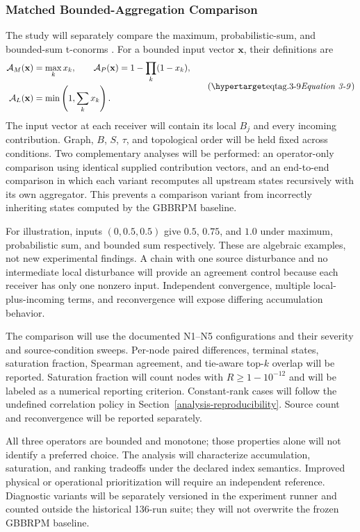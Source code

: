 \subsubsection{Matched Bounded-Aggregation Comparison}
\label{aggregation-comparison}

The study will separately compare the maximum, probabilistic-sum, and
bounded-sum t-conorms \citep{klement2004}. For a bounded input vector
$\mathbf{x}$, their definitions are
\[
\begin{aligned}
\mathcal{A}_{M}(\mathbf{x})&=\max_k x_k,\qquad
\mathcal{A}_{P}(\mathbf{x})=1-\prod_k(1-x_k),\\
\mathcal{A}_{L}(\mathbf{x})&=\min\left(1,\sum_k x_k\right).
\end{aligned}
\eqtag{3-9}
\]
The input vector at each receiver will contain its local $B_j$ and
every incoming contribution. Graph, $B$, $S$, $\tau$, and topological
order will be held fixed across conditions. Two complementary analyses
will be performed: an operator-only comparison using identical supplied
contribution vectors, and an end-to-end comparison in which each variant
recomputes all upstream states recursively with its own aggregator.
This prevents a comparison variant from incorrectly inheriting states
computed by the GBBRPM baseline.

For illustration, inputs $(0,0.5,0.5)$ give $0.5$, $0.75$, and $1.0$
under maximum, probabilistic sum, and bounded sum respectively. These
are algebraic examples, not new experimental findings. A chain with
one source disturbance and no intermediate local disturbance will
provide an agreement control because each receiver has only one
nonzero input. Independent convergence, multiple local-plus-incoming
terms, and reconvergence will expose differing accumulation behavior.

The comparison will use the documented N1--N5 configurations and their
severity and source-condition sweeps. Per-node paired differences,
terminal states, saturation fraction, Spearman agreement, and
tie-aware top-$k$ overlap will be reported. Saturation fraction will
count nodes with $R\ge1-10^{-12}$ and will be labeled as a numerical
reporting criterion. Constant-rank cases will follow the undefined
correlation policy in Section~\ref{analysis-reproducibility}.
Source count and reconvergence will be reported separately.

All three operators are bounded and monotone; those properties alone
will not identify a preferred choice. The analysis will characterize
accumulation, saturation, and ranking tradeoffs under the declared
index semantics. Improved physical or operational prioritization will
require an independent reference. Diagnostic variants will be separately
versioned in the experiment runner and counted outside the historical
136-run suite; they will not overwrite the frozen GBBRPM baseline.

